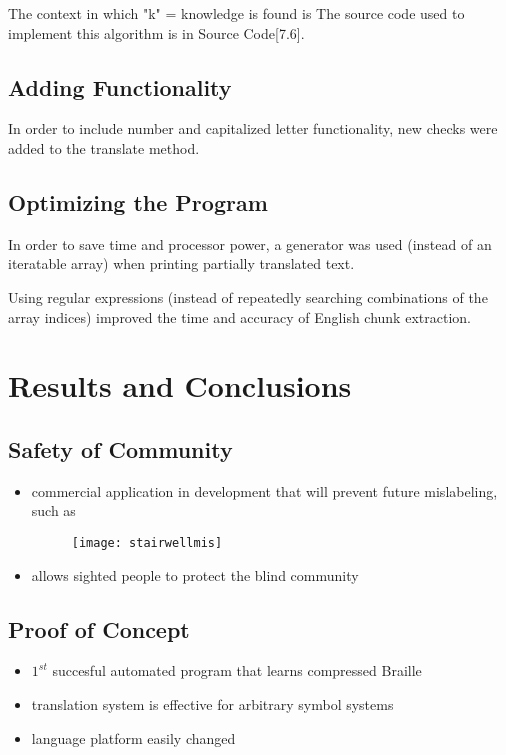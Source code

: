 \documentclass[26pt]{article}
\begin{document}
The context in which "k" = knowledge is found is The source code used to implement this algorithm is in Source Code[7.6].

\subsection{Adding Functionality}

In order to include number and capitalized letter functionality, new checks were added to the translate method. \newline

\subsection{Optimizing the Program}

In order to save time and processor power, a generator was used (instead of an iteratable array) when printing partially translated text.

Using regular expressions (instead of repeatedly searching combinations of the array indices) improved the time and accuracy of English chunk extraction.

\section{Results and Conclusions}

\subsection{Safety of Community}
\begin{itemize}
		\item commercial application in development that will prevent future mislabeling,  such as
	\begin{figure}[ht!]\centering
	\texttt{[image: stairwellmis]}
	\end{figure}
 		\item allows sighted people to protect the blind community
\end{itemize}

\subsection{Proof of Concept} 
             \begin{itemize}
    		\item $1^{st}$ succesful automated program that learns compressed Braille
		\item translation system is effective for arbitrary symbol systems 
		\item language platform easily changed
		\end{itemize}
\end{document}
